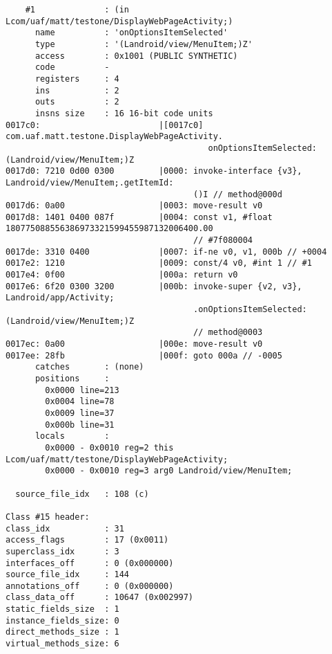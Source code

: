 \begin{lstlisting}
    #1              : (in Lcom/uaf/matt/testone/DisplayWebPageActivity;)
      name          : 'onOptionsItemSelected'
      type          : '(Landroid/view/MenuItem;)Z'
      access        : 0x1001 (PUBLIC SYNTHETIC)
      code          -
      registers     : 4
      ins           : 2
      outs          : 2
      insns size    : 16 16-bit code units
0017c0:                        |[0017c0] com.uaf.matt.testone.DisplayWebPageActivity.
                                         onOptionsItemSelected:(Landroid/view/MenuItem;)Z
0017d0: 7210 0d00 0300         |0000: invoke-interface {v3}, Landroid/view/MenuItem;.getItemId:
                                      ()I // method@000d
0017d6: 0a00                   |0003: move-result v0
0017d8: 1401 0400 087f         |0004: const v1, #float 180775088556386973321599455987132006400.00
                                      // #7f080004
0017de: 3310 0400              |0007: if-ne v0, v1, 000b // +0004
0017e2: 1210                   |0009: const/4 v0, #int 1 // #1
0017e4: 0f00                   |000a: return v0
0017e6: 6f20 0300 3200         |000b: invoke-super {v2, v3}, Landroid/app/Activity;
                                      .onOptionsItemSelected:(Landroid/view/MenuItem;)Z
                                      // method@0003
0017ec: 0a00                   |000e: move-result v0
0017ee: 28fb                   |000f: goto 000a // -0005
      catches       : (none)
      positions     :
        0x0000 line=213
        0x0004 line=78
        0x0009 line=37
        0x000b line=31
      locals        :
        0x0000 - 0x0010 reg=2 this Lcom/uaf/matt/testone/DisplayWebPageActivity;
        0x0000 - 0x0010 reg=3 arg0 Landroid/view/MenuItem;

  source_file_idx   : 108 (c)

Class #15 header:
class_idx           : 31
access_flags        : 17 (0x0011)
superclass_idx      : 3
interfaces_off      : 0 (0x000000)
source_file_idx     : 144
annotations_off     : 0 (0x000000)
class_data_off      : 10647 (0x002997)
static_fields_size  : 1
instance_fields_size: 0
direct_methods_size : 1
virtual_methods_size: 6


\end{lstlisting}
